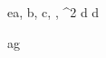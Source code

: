 \begin{eqcode}{e}{a, b, c}{, , ^2}{}
  d \in {} \lend
  d \gets {} \lend %
\end{eqcode}

\begin{eqcode}{a}{g }{}{}
  
\end{eqcode}
